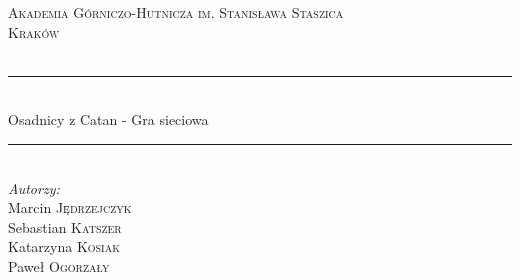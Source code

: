 \documentclass[a4paper, 11pt]{article}
\begin{document}
	
	\begin{titlepage}
	
	
		
		\newcommand{\HRule}{\rule{\linewidth}{0.5mm}} %
		
		\center %
		
		
		\textsc{\LARGE Akademia Górniczo-Hutnicza im. Stanisława Staszica}\\[1.5cm] %
		\textsc{\Large Kraków}\\[0.5cm] %
		\textsc{\large }\\[0.5cm] %
		
		
		\HRule \\[0.4cm]
		{\fontsize{38}{50}\selectfont Osadnicy z Catan - Gra sieciowa}
		\HRule \\[1.5cm]
		
		
		\Large \emph{Autorzy:}\\
		Marcin \textsc{Jędrzejczyk}\\ %
		Sebastian \textsc{Katszer}\\ %
		Katarzyna \textsc{Kosiak} \\
		Paweł \textsc{Ogorzały}\\[3cm]\ %


\end{titlepage}
\end{document}
